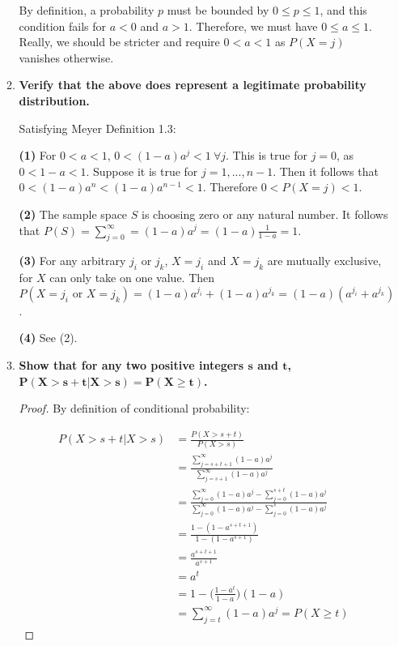 \documentclass[10pt, oneside]{article}   	%
\theoremstyle{definition}
\begin{document}
\begin{enumerate}[label=4.\arabic*]
\begin{enumerate}
	By definition, a probability $p$ must be bounded by $0 \leq p \leq 1$, and this condition fails for $a < 0$ and $a > 1$. Therefore, we must have $0 \leq a \leq 1$. Really, we should be stricter and require $0 < a < 1$ as $P(X = j)$ vanishes otherwise.
	
	\item  \begin{tcolorbox}[
	  colback=Cerulean!5!white,
	  colframe=Cerulean!75!black]
	\textbf{Verify that the above does represent a legitimate probability distribution.}
	\end{tcolorbox}
	
	Satisfying Meyer Definition 1.3:
	
	\textbf{(1)} For $0 < a < 1$, $0 < (1 - a)a^j < 1 \ \forall j$. This is true for $j = 0$, as $0 < 1-a < 1$. Suppose it is true for $j = 1, ..., n-1$. Then it follows that $0 < (1 - a)a^n < (1-a)a^{n-1} < 1$. Therefore $0 < P(X = j) < 1$.
	
	\textbf{(2)} The sample space $S$ is choosing zero or any natural number. It follows that $P(S) = \sum^\infty_{j = 0} = (1 - a)a^j = (1-a) \frac{1}{1-a} = 1$.
	
	\textbf{(3)} For any arbitrary $j_i$ or $j_k$, $X = j_i$ and $X = j_k$ are mutually exclusive, for $X$ can only take on one value. Then $P(X = j_i \text{ or } X = j_k) = (1 - a)a^{j_i} + (1 - a)a^{j_k} = (1 - a)(a^{j_i} + a^{j_k})$.
	
	\textbf{(4)} See (2).
	
	\item  \begin{tcolorbox}[
	  colback=Cerulean!5!white,
	  colframe=Cerulean!75!black]
	\textbf{Show that for any two positive integers $\bm{s}$ and $\bm{t}$, $\bm{P(X > s + t | X > s) = P(X \geq t)}$.}
	\end{tcolorbox}
	
	\begin{proof}
	By definition of conditional probability:
	
	\begin{align*}
	P(X > s + t | X > s) &= \frac{P(X > s + t)}{P(X > s)} \\
	&= \frac{\sum^\infty_{j = s + t + 1} (1-a)a^j}{\sum^\infty_{j = s + 1} (1-a)a^j} \\
	&= \frac{\sum^\infty_{j = 0} (1-a)a^j - \sum^{s+t}_{j = 0} (1-a)a^j}{\sum^\infty_{j = 0} (1-a)a^j - \sum^{s}_{j = 0} (1-a)a^j} \\
	&= \frac{1 - (1 - a^{s+t+1} ) }{1 - ( 1 - a^{s+1} ) } \\
	&= \frac{a^{s+t+1} }{a^{s+1} } \\
	&= a^t \\
	&= 1 - \Bigg( \frac{1 - a^t}{1-a} \Bigg) (1-a) \\
	&= \sum^\infty_{j = t} (1-a)a^j = P(X \geq t)
	\end{align*}
	\end{proof}
	\end{enumerate}
	

\end{enumerate}
\end{document}
